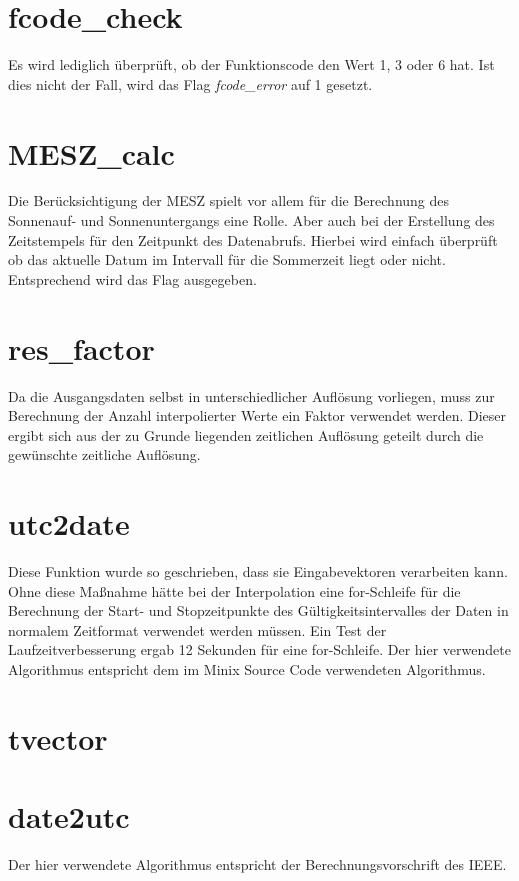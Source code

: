 \section{fcode\_check}\label{sec:fcodecheck}
Es wird lediglich überprüft, ob der Funktionscode den Wert 1, 3 oder 6 hat. Ist dies nicht der Fall, wird das Flag \textit{fcode\_error} auf 1 gesetzt.

\section{MESZ\_calc}\label{sec:meszcalc}
Die Berücksichtigung der MESZ spielt vor allem für die Berechnung des Sonnenauf- und Sonnenuntergangs eine Rolle. Aber auch bei der Erstellung des Zeitstempels für den Zeitpunkt des Datenabrufs. Hierbei wird einfach überprüft ob das aktuelle Datum im Intervall für die Sommerzeit liegt oder nicht. Entsprechend wird das Flag ausgegeben.

\section{res\_factor}\label{sec:resfactor}
Da die Ausgangsdaten selbst in unterschiedlicher Auflösung vorliegen, muss zur Berechnung der Anzahl interpolierter Werte ein Faktor verwendet werden. Dieser ergibt sich aus der zu Grunde liegenden zeitlichen Auflösung geteilt durch die gewünschte zeitliche Auflösung.

\section{utc2date}\label{sec:utc2date}
Diese Funktion wurde so geschrieben, dass sie Eingabevektoren verarbeiten kann. Ohne diese Maßnahme hätte bei der Interpolation eine for-Schleife für die Berechnung der Start- und Stopzeitpunkte des Gültigkeitsintervalles der Daten in normalem Zeitformat verwendet werden müssen. Ein Test der Laufzeitverbesserung ergab 12 Sekunden für eine for-Schleife. Der hier verwendete Algorithmus entspricht dem im Minix Source Code verwendeten Algorithmus.\cite{utc2date}

\section{tvector}\label{sec:tvector}

\section{date2utc}\label{sec:date2utc}
Der hier verwendete Algorithmus entspricht der Berechnungsvorschrift des IEEE.\cite[S. 113]{date2utc}

